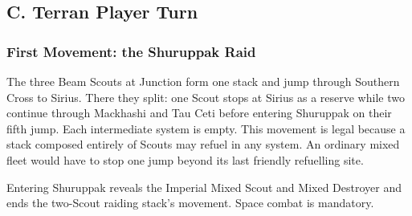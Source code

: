 \begin{center}
\end{center}

\subsection{C. Terran Player Turn}

\subsubsection{First Movement: the Shuruppak Raid}

The three Beam Scouts at Junction form one stack and jump through Southern
Cross to Sirius. There they split: one Scout stops at Sirius as a reserve while
two continue through Mackhashi and Tau Ceti before entering Shuruppak on their
fifth jump. Each intermediate system is empty. This movement is legal because
a stack composed entirely of Scouts may refuel in any system. An ordinary
mixed fleet would have to stop one jump beyond its last friendly refuelling
site.

Entering Shuruppak reveals the Imperial Mixed Scout and Mixed Destroyer and
ends the two-Scout raiding stack's movement. Space combat is mandatory.

